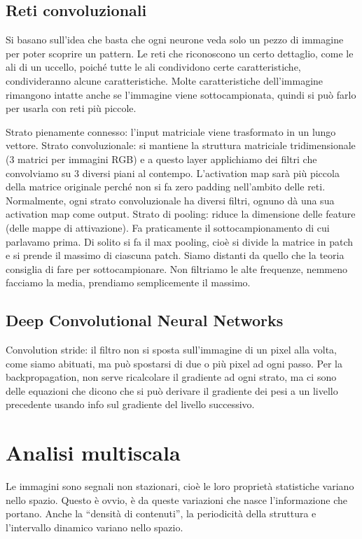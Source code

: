 \documentclass[a4paper,11pt]{article}
\begin{document}
\subsection{Reti convoluzionali}
Si basano sull'idea che basta che ogni neurone veda solo un pezzo di immagine per poter scoprire un pattern.
Le reti che riconoscono un certo dettaglio, come le ali di un uccello, poiché tutte le ali
condividono certe caratteristiche, condivideranno alcune caratteristiche.
Molte caratteristiche dell'immagine rimangono intatte anche se l'immagine viene sottocampionata, quindi si può farlo per usarla con reti più piccole.
\par
Strato pienamente connesso: l'input matriciale viene trasformato in un lungo vettore.
Strato convoluzionale: si mantiene la struttura matriciale tridimensionale (3 matrici per immagini RGB) e a questo layer applichiamo dei filtri che convolviamo su 3 diversi
piani al contempo.
L'activation map sarà più piccola della matrice originale perché non si fa zero padding nell'ambito delle reti.
Normalmente, ogni strato convoluzionale ha diversi filtri, ognuno dà una sua activation map come output.
Strato di pooling: riduce la dimensione delle feature (delle mappe di attivazione). Fa praticamente il sottocampionamento di cui parlavamo prima. Di solito si fa il max pooling, cioè si divide
la matrice in patch e si prende il massimo di ciascuna patch. Siamo distanti da quello che la teoria consiglia di fare per sottocampionare. Non filtriamo le alte frequenze,
nemmeno facciamo la media, prendiamo semplicemente il massimo.

\subsection{Deep Convolutional Neural Networks}
Convolution stride: il filtro non si sposta sull'immagine di un pixel alla volta, come siamo abituati, ma può spostarsi di due o più pixel ad ogni passo.
Per la backpropagation, non serve ricalcolare il gradiente ad ogni strato, ma ci sono delle equazioni che dicono che si può derivare il gradiente dei pesi a un livello precedente
usando info sul gradiente del livello successivo.

\newpage

\section{Analisi multiscala}
Le immagini sono segnali non stazionari, cioè le loro proprietà statistiche variano nello spazio. Questo è ovvio, è da queste variazioni che nasce l'informazione che portano.
Anche la ``densità di contenuti'', la periodicità della struttura e l'intervallo dinamico variano nello spazio.
\end{document}
